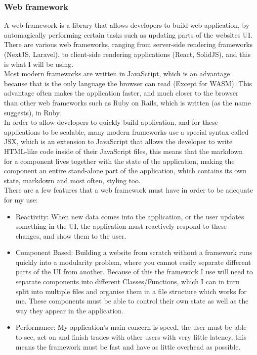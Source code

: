 \documentclass[titlepage]{article}
\begin{document}
\subsubsection{Web framework}
A web framework is a library that allows developers to build web application, by automagically performing certain tasks such as updating parts of the websites UI. There are various web frameworks, ranging from server-side rendering frameworks (NextJS, Laravel), to client-side rendering applications (React, SolidJS), and this is what I will be using. \\

Most modern frameworks are written in JavaScript, which is an advantage because that is the only language the browser can read (Except for WASM). This advantage often makes the application faster, and much closer to the browser than other web frameworks such as Ruby on Rails, which is written (as the name suggests), in Ruby. \\

In order to allow developers to quickly build application, and for these applications to be scalable, many modern frameworks use a special syntax called JSX, which is an extension to JavaScript that allows the developer to write HTML-like code inside of their JavaScript files, this means that the markdown for a component lives together with the state of the application, making the component an entire stand-alone part of the application, which contains its own state, markdown and most often, styling too. \\

There are a few features that a web framework must have in order to be adequate for my use:
\begin{itemize}
  \item Reactivity: When new data comes into the application, or the user updates something in the UI, the application must reactively respond to these changes, and show them to the user.
  \item Component Based: Building a website from scratch without a framework runs quickly into a modularity problem, where you cannot easily separate different parts of the UI from another. Because of this the framework I use will need to separate components into different Classes/Functions, which I can in turn split into multiple files and organise them in a file structure which works for me. These components must be able to control their own state as well as the way they appear in the application.
  \item Performance: My application's main concern is speed, the user must be able to see, act on and finish trades with other users with very little latency, this means the framework must be fast and have as little overhead as possible.
\end{itemize}
\end{document}

